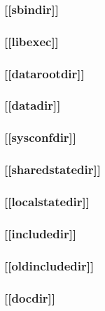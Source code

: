 \documentclass{article}
\begin{document}
\subsubsection{[[sbindir]]}
\label{sec:general-structure:std-vars:sbindir}

\subsubsection{[[libexec]]}
\label{sec:general-structure:std-vars:libexec}

\subsubsection{[[datarootdir]]}
\label{sec:general-structure:std-vars:datarootdir}

\subsubsection{[[datadir]]}
\label{sec:general-structure:std-vars:datadir}

\subsubsection{[[sysconfdir]]}
\label{sec:general-structure:std-vars:sysconfdir}

\subsubsection{[[sharedstatedir]]}
\label{sec:general-structure:std-vars:sharedstatedir}

\subsubsection{[[localstatedir]]}
\label{sec:general-structure:std-vars:localstatedir}

\subsubsection{[[includedir]]}
\label{sec:general-structure:std-vars:includedir}

\subsubsection{[[oldincludedir]]}
\label{sec:general-structure:std-vars:oldincludedir}

\subsubsection{[[docdir]]}
\label{sec:general-structure:std-vars:docdir}
\end{document}
